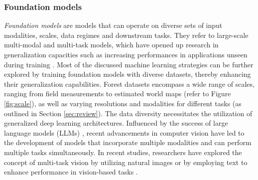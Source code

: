 \documentclass{CUP-JNL-DTM}%
\theoremstyle{definition}
\numberwithin{equation}{section}
\begin{document}
\subsubsection{Foundation models}
\label{sec:ml_foundation_models}
\emph{Foundation models} are models that can operate on diverse sets of input modalities, scales, data regimes and downstream tasks.
They refer to large-scale multi-modal and multi-task models, which have opened up research in generalization capacities such as increasing performances in applications unseen during training \cite{bommasani_opportunities_2021}. 
Most of the discussed machine learning strategies can be further explored by training foundation models with diverse datasets, thereby enhancing their generalization capabilities. 
Forest datasets encompass a wide range of scales, ranging from field measurements to estimated world maps (refer to Figure \ref{fig:scale}), as well as varying resolutions and modalities for different tasks (as outlined in Section \ref{sec:review}). The data diversity necessitates the utilization of generalized deep learning architectures.
%
Influenced by the success of large language models (LLMs) \cite{radford_language_2019, devlin_bert_2019, brown_language_2020, chowdhery_palm_2022, hoffmann_training_2022, radford_learning_2021, touvron_llama_2023, driess_palm-e_2023}, recent advancements in computer vision have led to the development of models that incorporate multiple modalities and can perform multiple tasks simultaneously. 
In recent studies, researchers have explored the concept of multi-task vision by utilizing natural images \cite{cheng_per-pixel_2021, cheng_masked-attention_2022, li_mask_2023, kirillov_segment_2023} or by employing text to enhance performance in vision-based tasks \cite{dancette_dynamic_2022, xu_groupvit_2022, jain_oneformer_2023}. 
\end{document}
